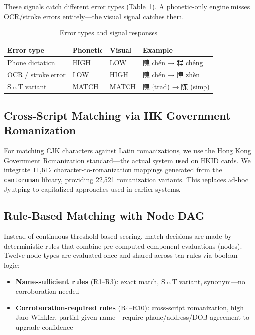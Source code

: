 \documentclass{article}
\begin{document}
These signals catch different error types (Table~\ref{tab:errors}). A phonetic-only engine misses OCR/stroke errors entirely—the visual signal catches them.

\begin{table}[h]
\centering
\caption{Error types and signal responses}\label{tab:errors}
\begin{tabular}{llll}
\toprule
Error type & Phonetic & Visual & Example \\
\midrule
Phone dictation & HIGH & LOW & 陳 chén → 程 chéng \\
OCR / stroke error & LOW & HIGH & 陳 chén → 陣 zhèn \\
S↔T variant & MATCH & MATCH & 陳 (trad) → 陈 (simp) \\
\bottomrule
\end{tabular}
\end{table}

\subsection{Cross-Script Matching via HK Government Romanization}

For matching CJK characters against Latin romanizations, we use the Hong Kong Government Romanization standard—the actual system used on HKID cards. We integrate 11,612 character-to-romanization mappings generated from the \texttt{cantoroman} library, providing 22,521 romanization variants. This replaces ad-hoc Jyutping-to-capitalized approaches used in earlier systems.

\subsection{Rule-Based Matching with Node DAG}

Instead of continuous threshold-based scoring, match decisions are made by deterministic rules that combine pre-computed component evaluations (nodes). Twelve node types are evaluated once and shared across ten rules via boolean logic:

\begin{itemize}
\tightlist
\item \textbf{Name-sufficient rules} (R1–R3): exact match, S↔T variant, synonym—no corroboration needed
\item \textbf{Corroboration-required rules} (R4–R10): cross-script romanization, high Jaro-Winkler, partial given name—require phone/address/DOB agreement to upgrade confidence
\end{itemize}
\end{document}
